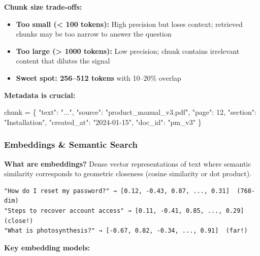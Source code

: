 \documentclass[11pt]{article}
\providecommand{\tightlist}{\setlength{\itemsep}{1pt}\setlength{\parskip}{0pt}}
\newenvironment{Shaded}{\begin{snugshade}}{\end{snugshade}}
\newcommand{\DecValTok}[1]{\textcolor[rgb]{0.96,0.45,0.00}{#1}}
\newcommand{\NormalTok}[1]{\textcolor[rgb]{0.81,0.81,0.76}{#1}}
\newcommand{\OperatorTok}[1]{\textcolor[rgb]{0.81,0.81,0.76}{#1}}
\newcommand{\StringTok}[1]{\textcolor[rgb]{0.96,0.31,0.31}{#1}}
\begin{document}
\textbf{Chunk size trade-offs:}

\begin{itemize}
\tightlist
\item
  \textbf{Too small (\textless{} 100 tokens):} High precision but loses context; retrieved chunks may be too narrow to answer the question
\item
  \textbf{Too large (\textgreater{} 1000 tokens):} Low precision; chunk contains irrelevant content that dilutes the signal
\item
  \textbf{Sweet spot: 256--512 tokens} with 10--20\% overlap
\end{itemize}

\textbf{Metadata is crucial:}


\begin{Shaded}
\begin{Highlighting}[]
\NormalTok{chunk }\OperatorTok{=}\NormalTok{ \{}
    \StringTok{"text"}\NormalTok{: }\StringTok{"..."}\NormalTok{,}
    \StringTok{"source"}\NormalTok{: }\StringTok{"product\_manual\_v3.pdf"}\NormalTok{,}
    \StringTok{"page"}\NormalTok{: }\DecValTok{12}\NormalTok{,}
    \StringTok{"section"}\NormalTok{: }\StringTok{"Installation"}\NormalTok{,}
    \StringTok{"created\_at"}\NormalTok{: }\StringTok{"2024{-}01{-}15"}\NormalTok{,}
    \StringTok{"doc\_id"}\NormalTok{: }\StringTok{"pm\_v3"}
\NormalTok{\}}
\end{Highlighting}
\end{Shaded}

\subsubsection{Embeddings \& Semantic Search}\label{embeddings--semantic-search}

\textbf{What are embeddings?} Dense vector representations of text where semantic similarity corresponds to geometric closeness (cosine similarity or dot product).

\setcodelang{}

\begin{verbatim}
"How do I reset my password?" → [0.12, -0.43, 0.87, ..., 0.31]  (768-dim)
"Steps to recover account access" → [0.11, -0.41, 0.85, ..., 0.29]  (close!)
"What is photosynthesis?" → [-0.67, 0.82, -0.34, ..., 0.91]  (far!)
\end{verbatim}

\textbf{Key embedding models:}
\end{document}
